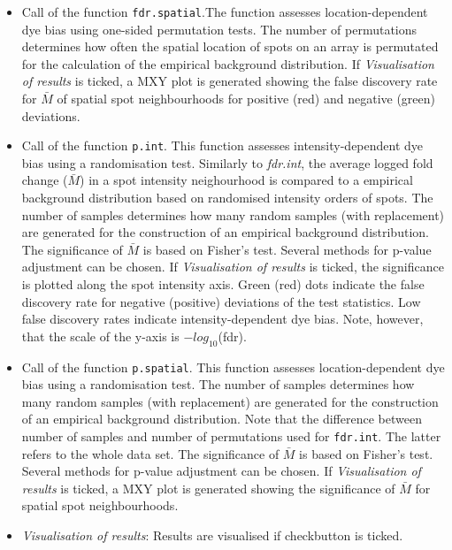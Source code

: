 \documentclass[a4paper,11pt]{article}
\begin{document}
\begin{itemize}
\item {}  Call of the function \texttt{fdr.spatial}.The function assesses location-dependent dye bias using 
one-sided  permutation tests. 
The number of permutations determines how often the spatial location of spots on  an array is permutated for the calculation of the empirical background distribution.    
If \textit{Visualisation of results} is ticked, 
a MXY plot is generated  showing the false discovery rate for  $\bar{M}$  of  spatial spot 
neighbourhoods for positive (red) and negative (green) deviations. 

\item {}  Call of the function \texttt{p.int}. This function assesses intensity-dependent dye bias using a randomisation test. Similarly to \textit{fdr.int}, the average logged fold change ($\bar{M}$) in a spot intensity neighourhood is compared to 
a empirical background distribution based on randomised intensity orders of spots.  
The number of samples determines how many random samples (with replacement) are generated  
for the construction of an empirical background distribution.   
The significance of  $\bar{M}$ is  based on Fisher's  test. Several methods for p-value adjustment can be chosen.
If  \textit{Visualisation of results} is ticked, the significance is plotted along the spot intensity axis.  Green (red)  dots indicate the false discovery rate 
for  negative (positive) deviations of the test statistics.
 Low false discovery rates indicate
intensity-dependent dye bias.  Note, however, that the scale of the y-axis  is $-log_{10}$(fdr).
 
  

\item {}  Call of the function \texttt{p.spatial}. This function assesses location-dependent dye bias using a randomisation test.  The number of samples determines how many random 
samples (with replacement) are generated  for the construction of an empirical background distribution.   
Note that the difference between number of samples and number of permutations used for \texttt{fdr.int}.
The latter refers to the whole data set. 
The significance of  $\bar{M}$ is  based on Fisher's test. Several methods for p-value adjustment can be chosen.
If \textit{Visualisation of results} is ticked, 
a MXY plot is generated  showing the significance of  $\bar{M}$  for spatial spot 
neighbourhoods. 

\item \textit{Visualisation of results}: Results are visualised if checkbutton is ticked.


\end{itemize}
\end{document}
